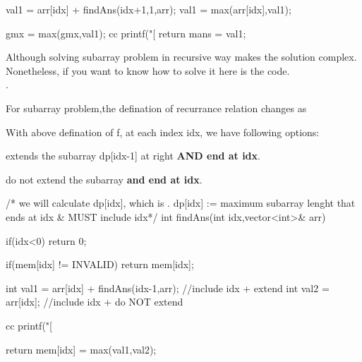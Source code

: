 \begin{solution}
\begin{code}
{            val1 = arr[idx] + findAns(idx+1,1,arr);
            val1 = max(arr[idx],val1);
            
            gmx = max({gmx,val1});
        cc  printf("[%
            return mans = val1;
        }
    \end{code}
\end{solution}

\begin{solution}
    Although solving subarray problem in recursive way makes the solution complex.
    Nonetheless, if you want to know how to solve it here is the code.\\[2mm]

    .

    \medskip
    For subarray problem,the defination of recurrance relation changes as \\  
    \medskip

    With above defination of f, at each index idx, we have following options:

    \begin{asparaenum}[(a)]
        \item extends the subarray dp[idx-1] at right \textbf{AND end at idx}.
        \item do not extend the subarray \textbf{and end at idx}.
    \end{asparaenum}

    \begin{code}
        /* we will calculate dp[idx], which is .
        dp[idx] := maximum subarray lenght that ends at idx & MUST include idx*/
        int findAns(int idx,vector<int>& arr)
        {
            if(idx<0) return 0;
            
            if(mem[idx] != INVALID)
                return mem[idx];
            
            int val1 = arr[idx] + findAns(idx-1,arr); //include idx + extend
            int val2 = arr[idx]; //include idx + do NOT extend
            
          cc  printf("[%
            
            return mem[idx] = max({val1,val2});
            
        }
    \end{code}
\end{solution}




